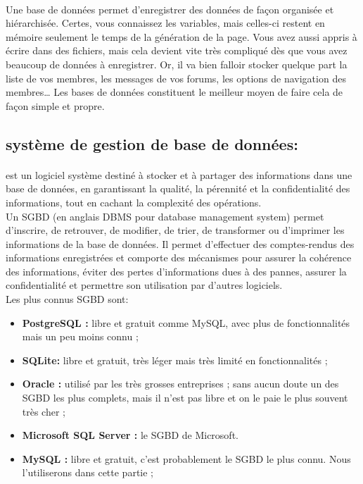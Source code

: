 \paragraph{}
Une base de données permet d'enregistrer des données de façon organisée et hiérarchisée. Certes, vous connaissez les variables, mais celles-ci restent en mémoire seulement le temps de la génération de la page. Vous avez aussi appris à écrire dans des fichiers, mais cela devient vite très compliqué dès que vous avez beaucoup de données à enregistrer.
Or, il va bien falloir stocker quelque part la liste de vos membres, les messages de vos forums, les options de navigation des membres… Les bases de données constituent le meilleur moyen de faire cela de façon simple et propre.

\subsection{système de gestion de base de données:}
\paragraph{}
est un logiciel système destiné à stocker et à partager des informations dans une base de données, en garantissant la qualité, la pérennité et la confidentialité des informations, tout en cachant la complexité des opérations.\\
Un SGBD (en anglais DBMS pour database management system) permet d'inscrire, de retrouver, de modifier, de trier, de transformer ou d'imprimer les informations de la base de données. Il permet d'effectuer des comptes-rendus des informations enregistrées et comporte des mécanismes pour assurer la cohérence des informations, éviter des pertes d'informations dues à des pannes, assurer la confidentialité et permettre son utilisation par d'autres logiciels. \\
Les plus connus SGBD sont:
\begin{itemize}
	\item \textbf{PostgreSQL :} libre et gratuit comme MySQL, avec plus de fonctionnalités mais un peu moins connu ;
	\item \textbf{SQLite:} libre et gratuit, très léger mais très limité en fonctionnalités ;
	\item \textbf{Oracle :} utilisé par les très grosses entreprises ; sans aucun doute un des SGBD les plus complets, mais il n'est pas libre et on le paie le plus souvent très cher ;
	\item \textbf{Microsoft SQL Server :} le SGBD de Microsoft.
	\item \textbf{MySQL :} libre et gratuit, c'est probablement le SGBD le plus connu. Nous l'utiliserons dans cette partie ;
\end{itemize}
